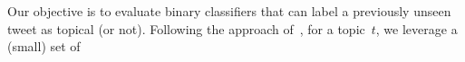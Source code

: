


Our objective is to evaluate binary classifiers that can label
a previously unseen tweet as topical (or not).
%
%
%
Following
the approach of~\cite{lin2011smoothing}, for a topic~$t$, we leverage a (small) set of
